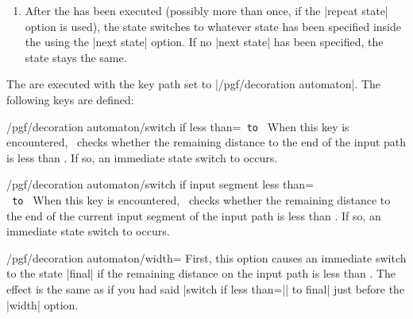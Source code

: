 \begin{command}{\pgfdeclaredecoration{}}
\begin{command}{\state{}}
\begin{enumerate}
\begin{codeexample}[]
\tikz\path[decorate, decoration=stars, star point ratio=2, star points=5,
           inner sep=0, minimum size=rnd*10pt+2pt]
  (0,0) .. controls (0,2)  and (3,2)  .. (3,0)
        .. controls (3,-3) and (0,0)  .. (0,-3)
        .. controls (0,-5) and (3,-5) .. (3,-3);
\end{codeexample}

    \item
      After the  has been executed (possibly more than
      once, if the |repeat state| option is used), the state switches to
      whatever state has been specified inside the 
      using the |next state| option. If no |next state| has been
      specified, the state stays the same.
    \end{enumerate}

    The  are executed with the key path set to
    |/pgf/decoration automaton|. The following keys are defined:
    \begin{key}{/pgf/decoration automaton/switch if less than=\texttt{ to }}
      When this key is encountered, \pgfname\ checks whether the
      remaining distance to the end of the input path is less than
      . If so, an immediate state switch to  occurs.
    \end{key}
    \begin{key}{/pgf/decoration automaton/switch if input segment less than=\\\texttt{ to }}
      When this key is encountered, \pgfname\ checks whether the
      remaining distance to the end of the current input segment of the
      input path is less than . If so, an immediate
      state switch to  occurs.
    \end{key}
    \begin{key}{/pgf/decoration automaton/width=}
      First, this option causes an immediate switch to the
      state |final| if the remaining distance on the input path is
      less than . The effect is the same as if you had
      said |switch if less than=|| to final| just
      before the |width| option.


\end{key}
\end{command}
\end{command}
